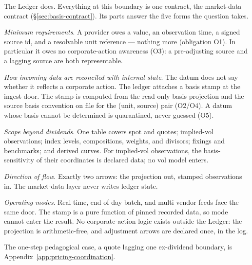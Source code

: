 The Ledger does. Everything at this boundary is one contract, the market-data
contract (\S\ref{sec:basis-contract}). Its parts answer the five forms the
question takes.

\emph{Minimum requirements}. A provider owes a value, an observation time, a
signed source id, and a resolvable unit reference --- nothing more (obligation
O1). In particular it owes no corporate-action awareness (O3): a pre-adjusting
source and a lagging source are both representable.

\emph{How incoming data are reconciled with internal state}. The datum does not
say whether it reflects a corporate action. The ledger attaches a basis stamp
at the ingest door. The stamp is computed from the read-only basis projection
and the source basis convention on file for the (unit, source) pair (O2/O4). A datum
whose basis cannot be determined is quarantined, never guessed (O5).

\emph{Scope beyond dividends}. One table covers spot and quotes; implied-vol
observations; index levels, compositions, weights, and divisors; fixings and
benchmarks; and derived curves. For implied-vol observations, the
basis-sensitivity of their coordinates is declared data; no vol model enters.

\emph{Direction of flow}. Exactly two arrows: the projection out, stamped
observations in. The market-data layer never writes ledger state.

\emph{Operating modes}. Real-time, end-of-day batch, and multi-vendor feeds face
the same door. The stamp is a pure function of pinned recorded data, so mode
cannot enter the result. No corporate-action logic exists outside the Ledger:
the projection is arithmetic-free, and adjustment arrows are declared once, in
the log.

The one-step pedagogical case, a quote lagging one ex-dividend boundary, is
Appendix~\ref{app:pricing-coordination}.

\clearpage
